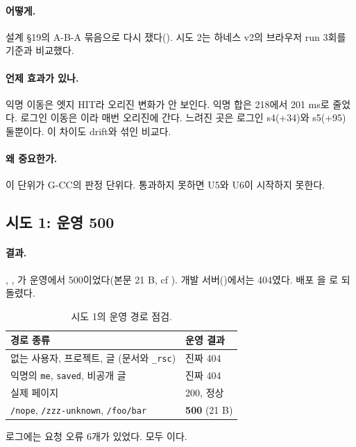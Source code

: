\paragraph{어떻게.}
설계 \S19의 A-B-A 묶음으로 다시 쟀다().
시도 2는 하네스 v2의 브라우저 run 3회를 기준과 비교했다.

\paragraph{언제 효과가 있나.}
익명 이동은 엣지 HIT라 오리진 변화가 안 보인다. 익명 합은 218에서 201 ms로 줄었다.
로그인 이동은 이라 매번 오리진에 간다. 느려진 곳은 로그인 s4(+34)와 s5(+95) 둘뿐이다. 이 차이도 drift와 섞인 비교다.

\paragraph{왜 중요한가.}
이 단위가 G-CC의 판정 단위다. 통과하지 못하면 U5와 U6이 시작하지 못한다.

\subsection{시도 1: 운영 500}\label{sec:re-u4-a1}

\paragraph{결과.}
, , 가 운영에서 500이었다(본문 21 B, cf ).
개발 서버()에서는 404였다. 배포 을 로 되돌렸다.
\begin{table}[H]
  \caption{시도 1의 운영 경로 점검.}
  \label{tab:re-u4-a1}
  \centering\small
  \begin{tabularx}{\linewidth}{@{}Y L{3.6cm}@{}}
    \toprule
    경로 종류 & 운영 결과 \\
    \midrule
    없는 사용자, 프로젝트, 글 (문서와 \texttt{\_rsc}) & 진짜 404 \\
    \midrule
    익명의 \texttt{me}, \texttt{saved}, 비공개 글 & 진짜 404 \\
    \midrule
    실제 페이지 & 200, 정상 \\
    \midrule
    \texttt{/nope}, \texttt{/zzz-unknown}, \texttt{/foo/bar} & \textbf{500} (21 B) \\
    \bottomrule
  \end{tabularx}
\end{table}
로그에는 요청 오류 6개가 있었다. 모두 이다.

